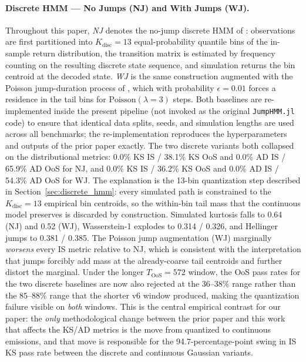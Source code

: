 \paragraph{Discrete HMM --- No Jumps (NJ) and With Jumps (WJ).}
Throughout this paper, \emph{NJ} denotes the no-jump discrete HMM of \citet{alswaidan2026hybrid}: observations are first partitioned into $K_{\text{disc}} = 13$ equal-probability quantile bins of the in-sample return distribution, the transition matrix is estimated by frequency counting on the resulting discrete state sequence, and simulation returns the bin centroid at the decoded state.
\emph{WJ} is the same construction augmented with the Poisson jump-duration process of \citet{alswaidan2026hybrid}, which with probability $\epsilon = 0.01$ forces a residence in the tail bins for $\text{Poisson}(\lambda = 3)$ steps.
Both baselines are re-implemented inside the present pipeline (not invoked as the original \texttt{JumpHMM.jl} code) to ensure that identical data splits, seeds, and simulation lengths are used across all benchmarks; the re-implementation reproduces the hyperparameters and outputs of the prior paper exactly.
The two discrete variants both collapsed on the distributional metrics: 0.0\% KS IS / 38.1\% KS OoS and 0.0\% AD IS / 65.9\% AD OoS for NJ, and 0.0\% KS IS / 36.2\% KS OoS and 0.0\% AD IS / 54.3\% AD OoS for WJ.
The explanation is the 13-bin quantization step described in Section~\ref{sec:discrete_hmm}: every simulated path is constrained to the $K_{\text{disc}} = 13$ empirical bin centroids, so the within-bin tail mass that the continuous model preserves is discarded by construction.
Simulated kurtosis falls to 0.64 (NJ) and 0.52 (WJ), Wasserstein-1 explodes to 0.314 / 0.326, and Hellinger jumps to 0.381 / 0.385.
The Poisson jump augmentation (WJ) marginally \emph{worsens} every IS metric relative to NJ, which is consistent with the interpretation that jumps forcibly add mass at the already-coarse tail centroids and further distort the marginal.
Under the longer $T_{\text{OoS}} = 572$ window, the OoS pass rates for the two discrete baselines are now also rejected at the $36$--$38\%$ range rather than the $85$--$88\%$ range that the shorter v6 window produced, making the quantization failure visible on \emph{both} windows.
This is the central empirical contrast for our paper: the \emph{only} methodological change between the prior paper and this work that affects the KS/AD metrics is the move from quantized to continuous emissions, and that move is responsible for the 94.7-percentage-point swing in IS KS pass rate between the discrete and continuous Gaussian variants.

